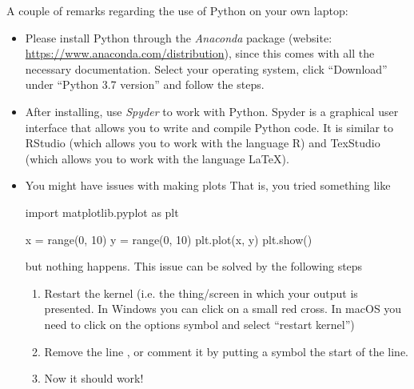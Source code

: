 A couple of remarks regarding the use of Python on your own laptop:
\begin{itemize}
\item Please install Python through the \emph{Anaconda} package (website: \url{https://www.anaconda.com/distribution}), since this comes with all the necessary documentation. Select your operating system, click ``Download'' under ``Python 3.7 version'' and follow the steps.
\item After installing, use \emph{Spyder} to work with Python. Spyder is a graphical user interface that allows you to write and compile Python code. It is similar to RStudio (which allows you to work with the language R) and TexStudio (which allows you to work with the language \LaTeX\/).
\item You might have issues with making plots That is, you tried something like
\begin{pyverbatim}
import matplotlib.pyplot as plt

x = range(0, 10)
y = range(0, 10)
plt.plot(x, y)
plt.show()
\end{pyverbatim}
but nothing happens. This issue can be solved by the following steps
\begin{enumerate}
\item Restart the kernel (i.e. the thing/screen in which your output is presented. In Windows you can click on a small red cross. In macOS you need to click on the options symbol and select ``restart kernel'')
\item Remove the line , or comment it by putting a \pyv{#} symbol the start of the line.
\item Now it should work!
\end{enumerate}
\end{itemize}
